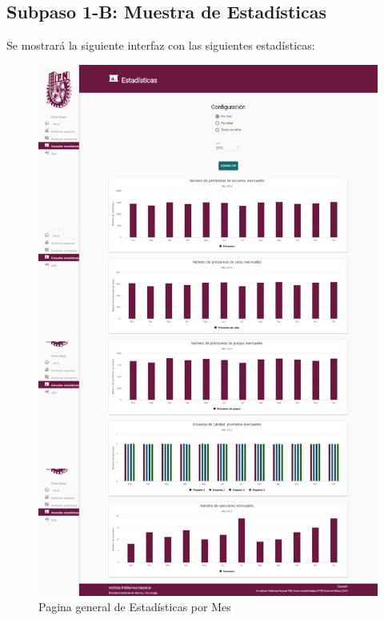 \subsection{Subpaso 1-B: Muestra de Estadísticas}
	Se mostrará la siguiente interfaz con las siguientes estadísticas:
	\begin{figure}[hbtp]
		\includegraphics[scale=0.3]{images/Interfaz/IUGS15_estadisticasMes.PNG}
		\caption{Pagina general de Estadísticas por Mes}
	\end{figure}	
	
